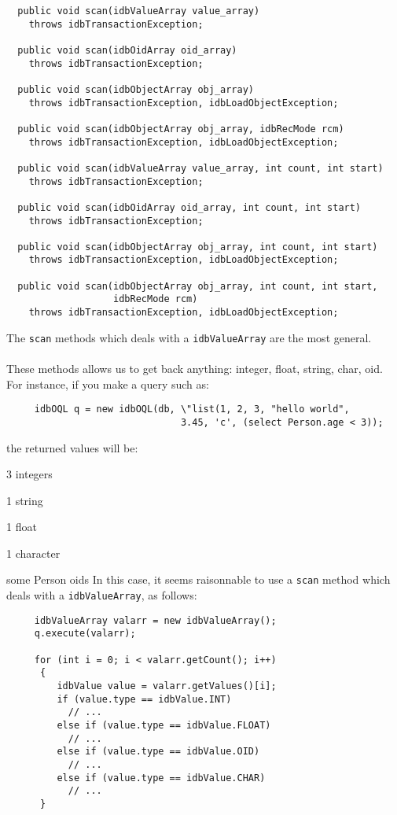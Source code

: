 {\verbsize \begin{verbatim}
  public void scan(idbValueArray value_array)
    throws idbTransactionException;

  public void scan(idbOidArray oid_array)
    throws idbTransactionException;

  public void scan(idbObjectArray obj_array)
    throws idbTransactionException, idbLoadObjectException;

  public void scan(idbObjectArray obj_array, idbRecMode rcm)
    throws idbTransactionException, idbLoadObjectException;

  public void scan(idbValueArray value_array, int count, int start)
    throws idbTransactionException;

  public void scan(idbOidArray oid_array, int count, int start)
    throws idbTransactionException;

  public void scan(idbObjectArray obj_array, int count, int start)
    throws idbTransactionException, idbLoadObjectException;

  public void scan(idbObjectArray obj_array, int count, int start,
                   idbRecMode rcm)
    throws idbTransactionException, idbLoadObjectException;
\end{verbatim}
}
The \texttt{scan} methods which deals with a \texttt{idbValueArray} are
the most general.
\\
\\
These methods allows us to get back anything: integer, float, string, char,
oid.
\\
For instance, if you make a query such as:
{\verbsize \begin{verbatim}
     idbOQL q = new idbOQL(db, \"list(1, 2, 3, "hello world",
                               3.45, 'c', (select Person.age < 3));
\end{verbatim}
}
the returned values will be:
\bi
\item 3 integers
\item 1 string
\item 1 float
\item 1 character
\item some Person oids
\ei
In this case, it seems raisonnable to use a \texttt{scan} method which
deals with a \texttt{idbValueArray}, as follows:
{\verbsize \begin{verbatim}
     idbValueArray valarr = new idbValueArray();
     q.execute(valarr);   

     for (int i = 0; i < valarr.getCount(); i++)
      {
         idbValue value = valarr.getValues()[i];
         if (value.type == idbValue.INT)
           // ...
         else if (value.type == idbValue.FLOAT)
           // ...
         else if (value.type == idbValue.OID)
           // ...
         else if (value.type == idbValue.CHAR)
           // ...
      }
\end{verbatim}
}
